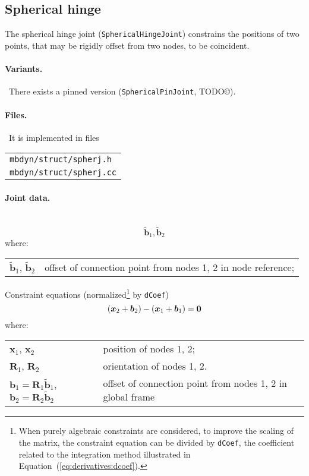 \documentclass[10pt,fleqn,subeqn]{report}
\newcommand{\T}[1]{\bm{#1}}
\begin{document}
\subsection{Spherical hinge}
The spherical hinge joint (\texttt{SphericalHingeJoint}) constrains the positions
of two points, that may be rigidly offset from two nodes, to be coincident.

\paragraph{Variants.} \
There exists a pinned version (\texttt{SphericalPinJoint}, TODO\copyright).

\paragraph{Files.} \
It is implemented in files

\begin{tabular}{l}
\texttt{mbdyn/struct/spherj.h} \\
\texttt{mbdyn/struct/spherj.cc}
\end{tabular}

\paragraph{Joint data.} \
\begin{equation}
	\tilde{\T{b}}_1, \tilde{\T{b}}_2
\end{equation}
where:

\noindent
\begin{tabular}{ll}
$\tilde{\T{b}}_1$, $\tilde{\T{b}}_2$ & offset of connection point from nodes 1, 2 in node reference; \\
\end{tabular}

\noindent
Constraint equations (normalized\footnote{When purely algebraic
constraints are considered, to improve the scaling of the matrix,
the constraint equation can be divided by \texttt{dCoef},
the coefficient related to the integration method illustrated 
in Equation~(\ref{eq:derivatives:dcoef}).
} by \texttt{dCoef})
\begin{equation}
	\plbr{\T{x}_2 + \T{b}_2} - \plbr{\T{x}_1 + \T{b}_1} = \T{0}
\end{equation}
where:

\noindent
\begin{tabular}{ll}
$\T{x}_1$, $\T{x}_2$ & position of nodes 1, 2; \\
$\T{R}_1$, $\T{R}_2$ & orientation of nodes 1, 2.\\
$\T{b}_1 = \T{R}_1 \tilde{\T{b}}_1$, $\T{b}_2 = \T{R}_2 \tilde{\T{b}}_2$ & offset of connection point from nodes 1, 2 in global frame
\end{tabular}
\end{document}
